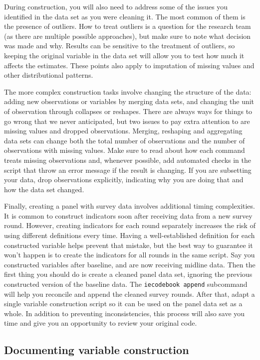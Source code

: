 During construction, you will also need to address some of the issues
you identified in the data set as you were cleaning it.
The most common of them is the presence of outliers.
How to treat outliers is a question for the research team (as there are multiple possible approaches),
but make sure to note what decision was made and why.
Results can be sensitive to the treatment of outliers,
so keeping the original variable in the data set will allow you to test how much it affects the estimates.
These points also apply to imputation of missing values and other distributional patterns.

The more complex construction tasks involve changing the structure of the data:
adding new observations or variables by merging data sets,
and changing the unit of observation through collapses or reshapes.
There are always ways for things to go wrong that we never anticipated,
but two issues to pay extra attention to are missing values and dropped observations.
Merging, reshaping and aggregating data sets can change both the total number of observations
and the number of observations with missing values.
Make sure to read about how each command treats missing observations and,
whenever possible, add automated checks in the script that throw an error message if the result is changing.
If you are subsetting your data,
drop observations explicitly,
indicating why you are doing that and how the data set changed.

Finally, creating a panel with survey data involves additional timing complexities.
It is common to construct indicators soon after receiving data from a new survey round.
However, creating indicators for each round separately increases the risk of using different definitions every time.
Having a well-established definition for each constructed variable helps prevent that mistake,
but the best way to guarantee it won't happen is to create the indicators for all rounds in the same script.
Say you constructed variables after baseline, and are now receiving midline data.
Then the first thing you should do is create a cleaned panel data set,
ignoring the previous constructed version of the baseline data.
The \texttt{iecodebook append} subcommand will help you reconcile and append the cleaned survey rounds.
After that, adapt a single variable construction script so it can be used on the panel data set as a whole.
In addition to preventing inconsistencies,
this process will also save you time and give you an opportunity to review your original code.

\subsection{Documenting variable construction}

